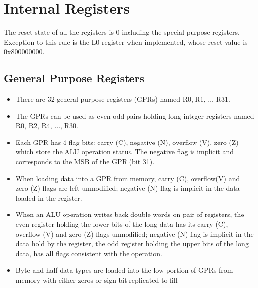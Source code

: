 \section{Internal Registers}
\label{sec:registers}
The reset state of all the registers is 0 including the special purpose registers. Exception to this rule is the L0
register when implemented, whose reset value is 0x800000000.

\subsection{General Purpose Registers}
\label{ssec:gprs}
\begin{itemize}
   \item There are 32 general purpose registers (GPRs) named R0, R1, $\ldots$ R31.
   \item The GPRs can be used as even-odd pairs holding long integer registers named R0, R2, R4, $\ldots$, R30.
   \item Each GPR has 4 flag bits: carry (C), negative (N), overflow (V), zero (Z) which store the ALU operation status. The negative
         flag is implicit and corresponds to the MSB of the GPR (bit 31).
   \item When loading data into a GPR from memory, carry (C), overflow(V) and zero (Z) flags are left unmodified; negative (N) flag is implicit in the data
	 loaded in the register.
   \item When an ALU operation writes back double words on pair of registers, the even register holding the lower bits of the long data has its carry (C),
         overflow (V) and zero (Z) flags unmodified; negative (N) flag is implicit in the data hold by the register, the odd register holding the upper bits
         of the long data, has all flags consistent with the operation.
   \item Byte and half data types are loaded into the low portion of GPRs from memory with either zeros or sign bit replicated to fill

\end{itemize}
